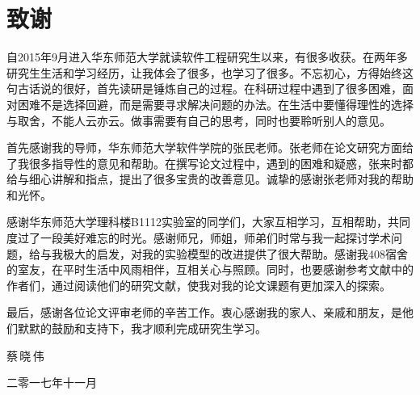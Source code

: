 {\kaishu
\chapter*{致\qquad 谢}
自2015年9月进入华东师范大学就读软件工程研究生以来，有很多收获。在两年多研究生生活和学习经历，让我体会了很多，也学习了很多。不忘初心，方得始终这句古话说的很好，首先读研是锤炼自己的过程。在科研过程中遇到了很多困难，面对困难不是选择回避，而是需要寻求解决问题的办法。在生活中要懂得理性的选择与取舍，不能人云亦云。做事需要有自己的思考，同时也要聆听别人的意见。

首先感谢我的导师，华东师范大学软件学院的张民老师。张老师在论文研究方面给了我很多指导性的意见和帮助。在撰写论文过程中，遇到的困难和疑惑，张来时都给与细心讲解和指点，提出了很多宝贵的改善意见。诚挚的感谢张老师对我的帮助和光怀。

感谢华东师范大学理科楼B1112实验室的同学们，大家互相学习，互相帮助，共同度过了一段美好难忘的时光。感谢师兄，师姐，师弟们时常与我一起探讨学术问题，给与我极大的启发，对我的实验模型的改进提供了很大帮助。感谢我408宿舍的室友，在平时生活中风雨相伴，互相关心与照顾。同时，也要感谢参考文献中的作者们，通过阅读他们的研究文献，使我对我的论文课题有更加深入的探索。

最后，感谢各位论文评审老师的辛苦工作。衷心感谢我的家人、亲戚和朋友，是他们默默的鼓励和支持下，我才顺利完成研究生学习。

\vspace{0.8cm} \hspace{9.8cm} 蔡\,晓\,伟

\hspace{9cm}  二零一七年十一月 }
